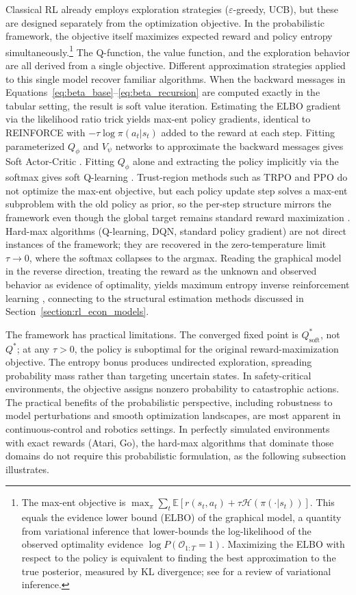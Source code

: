 Classical RL already employs exploration strategies ($\varepsilon$-greedy, UCB), but these are designed separately from the optimization objective. In the probabilistic framework, the objective itself maximizes expected reward and policy entropy simultaneously.\footnote{The max-ent objective is $\max_\pi \sum_t \mathbb{E}[r(s_t,a_t) + \tau \mathcal{H}(\pi(\cdot|s_t))]$. This equals the evidence lower bound (ELBO) of the graphical model, a quantity from variational inference that lower-bounds the log-likelihood of the observed optimality evidence $\log P(\mathcal{O}_{1:T} = 1)$. Maximizing the ELBO with respect to the policy is equivalent to finding the best approximation to the true posterior, measured by KL divergence; see \citet{BleiKucukelbirMcAuliffe2017} for a review of variational inference.} The Q-function, the value function, and the exploration behavior are all derived from a single objective. Different approximation strategies applied to this single model recover familiar algorithms. When the backward messages in Equations~\eqref{eq:beta_base}--\eqref{eq:beta_recursion} are computed exactly in the tabular setting, the result is soft value iteration. Estimating the ELBO gradient via the likelihood ratio trick yields max-ent policy gradients, identical to REINFORCE with $-\tau \log \pi(a_t|s_t)$ added to the reward at each step. Fitting parameterized $Q_\phi$ and $V_\psi$ networks to approximate the backward messages gives Soft Actor-Critic \citep{Haarnoja2018}. Fitting $Q_\phi$ alone and extracting the policy implicitly via the softmax gives soft Q-learning \citep{Haarnoja2017}. Trust-region methods such as TRPO and PPO do not optimize the max-ent objective, but each policy update step solves a max-ent subproblem with the old policy as prior, so the per-step structure mirrors the framework even though the global target remains standard reward maximization \citep{Schulman2015, Schulman2017}. Hard-max algorithms (Q-learning, DQN, standard policy gradient) are not direct instances of the framework; they are recovered in the zero-temperature limit $\tau \to 0$, where the softmax collapses to the argmax. Reading the graphical model in the reverse direction, treating the reward as the unknown and observed behavior as evidence of optimality, yields maximum entropy inverse reinforcement learning \citep{Ziebart2008}, connecting to the structural estimation methods discussed in Section~\ref{section:rl_econ_models}.

The framework has practical limitations. The converged fixed point is $Q^*_{\mathrm{soft}}$, not $Q^*$; at any $\tau > 0$, the policy is suboptimal for the original reward-maximization objective. The entropy bonus produces undirected exploration, spreading probability mass rather than targeting uncertain states. In safety-critical environments, the objective assigns nonzero probability to catastrophic actions. The practical benefits of the probabilistic perspective, including robustness to model perturbations and smooth optimization landscapes, are most apparent in continuous-control and robotics settings. In perfectly simulated environments with exact rewards (Atari, Go), the hard-max algorithms that dominate those domains do not require this probabilistic formulation, as the following subsection illustrates.

